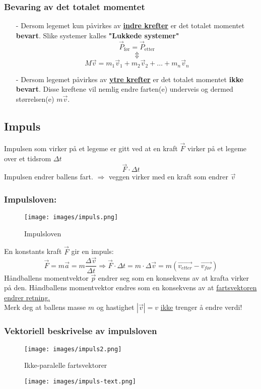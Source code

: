 \documentclass[12pt]{article}
\begin{document}
\subsubsection{Bevaring av det totalet momentet}
\begin{itemize}
    \item[-] Dersom legemet kun påvirkes av \underline{\textbf{indre krefter}} er det totalet momentet \textbf{bevart}. Slike systemer kalles \textbf{"Lukkede systemer"}
    $$\Vec{P}_{\text{før}} = \Vec{P}_{\text{etter}} $$
    $$\Updownarrow$$
    $$M\Vec{v} = m_1\Vec{v}_1 + m_2\Vec{v}_2 + \dots + m_n\Vec{v}_n$$
    \item[-] Dersom legemet påvirkes av \underline{\textbf{ytre krefter}} er det totalet momentet \textbf{ikke bevart}. Disse kreftene vil nemlig  endre farten(e) underveis og dermed størrelsen(e) $m\Vec{v}$.
\end{itemize}

\pagebreak
\subsection{Impuls}
Impulsen som virker på et legeme er gitt ved at en kraft $\Vec{F}$ virker på et legeme over et tidsrom $\Delta t$
$$\Vec{F}\cdot \Delta t$$
Impulsen endrer ballens fart. $\Rightarrow$ veggen virker med en kraft som endrer $\Vec{v}$

\subsubsection{\textbf{Impulsloven:}}
\begin{figure} [H]
    \centering
    \texttt{[image: images/impuls.png]}
    \caption{Impulsloven}
\end{figure}
En konstants kraft $\Vec{F}$ gir en impuls:
$$\Vec{F} = m\Vec{a} = m\frac{\Delta\Vec{v}}{\Delta t} \Rightarrow \Vec{F}\cdot\Delta t = m\cdot\Delta\Vec{v} = m(\Vec{v_{etter}} - \Vec{v_{før}})$$
Håndballens momentvektor $\Vec{p}$ endrer seg som en konsekvens av at krafta virker på den.
Håndballens momentvektor endres som en konsekvens av at \underline{fartsvektoren endrer retning.}\\
\bigskip
\color{blue}
Merk deg at ballens masse $m$ og hastighet $|\Vec{v}| = v$ \underline{ikke} trenger å endre verdi!
\color{black}
\pagebreak
\subsubsection{Vektoriell beskrivelse av impulsloven}
\begin{figure} [H]
    \centering
    \texttt{[image: images/impuls2.png]}
    \caption{Ikke-paralelle fartsvektorer}
\end{figure}
\begin{figure} [H]
    
    \texttt{[image: images/impuls-text.png]}
\end{figure}
\end{document}
